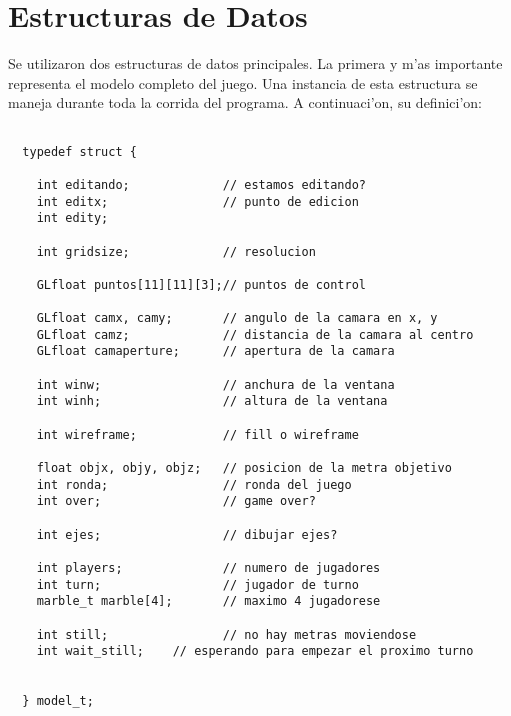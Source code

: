 \documentclass[10pt,letterpaper]{article}
\begin{document}
\section{Estructuras de Datos}
Se utilizaron dos estructuras de datos principales. La primera y m'as
importante representa el modelo completo del juego. Una instancia de
esta estructura se maneja durante toda la corrida del programa. A
continuaci'on, su definici'on:
\lstset{language=[ANSI]C,tabsize=2}
\begin{lstlisting}

  typedef struct {
    
    int editando;             // estamos editando?
    int editx;                // punto de edicion
    int edity;

    int gridsize;             // resolucion

    GLfloat puntos[11][11][3];// puntos de control

    GLfloat camx, camy;       // angulo de la camara en x, y
    GLfloat camz;             // distancia de la camara al centro
    GLfloat camaperture;      // apertura de la camara

    int winw;                 // anchura de la ventana
    int winh;                 // altura de la ventana

    int wireframe;            // fill o wireframe

    float objx, objy, objz;   // posicion de la metra objetivo
    int ronda;                // ronda del juego
    int over;                 // game over?

    int ejes;                 // dibujar ejes?
    
    int players;              // numero de jugadores
    int turn;                 // jugador de turno
    marble_t marble[4];       // maximo 4 jugadorese

    int still;                // no hay metras moviendose
    int wait_still;    // esperando para empezar el proximo turno


  } model_t;

\end{lstlisting}
\end{document}
